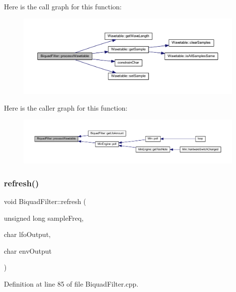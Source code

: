 Here is the call graph for this function\+:
\nopagebreak
\begin{figure}[H]
\begin{center}
\leavevmode
\includegraphics[width=350pt]{class_biquad_filter_a205ea1f856a52f5d369d45cf385df801_cgraph}
\end{center}
\end{figure}
Here is the caller graph for this function\+:
\nopagebreak
\begin{figure}[H]
\begin{center}
\leavevmode
\includegraphics[width=350pt]{class_biquad_filter_a205ea1f856a52f5d369d45cf385df801_icgraph}
\end{center}
\end{figure}
\mbox{\label{class_biquad_filter_a6b84cee1d3982596d90d3b1a74208b2a}} 
\subsubsection{\texorpdfstring{refresh()}{refresh()}}
{\footnotesize\ttfamily void Biquad\+Filter\+::refresh (\begin{DoxyParamCaption}\item[{unsigned long}]{sample\+Freq,  }\item[{char}]{lfo\+Output,  }\item[{char}]{env\+Output }\end{DoxyParamCaption})}



Definition at line 85 of file Biquad\+Filter.\+cpp.


